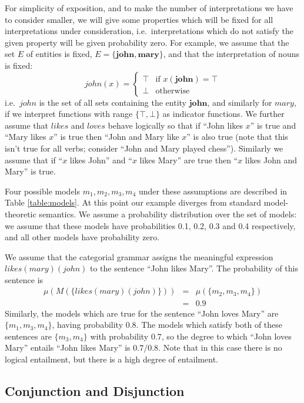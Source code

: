 \documentclass[letterpaper]{article}
\begin{document}
For simplicity of exposition, and to make the number of
interpretations we have to consider smaller, we will give some
properties which will be fixed for all interpretations under
consideration, i.e.~interpretations which do not satisfy the given
property will be given probability zero. For example, we assume that
the set $E$ of entities is fixed, $E = \{\mathbf{john},
\mathbf{mary}\}$, and that the interpretation of nouns is fixed:
$$\mathit{john}(x) = \begin{cases}
\top & \text{if } x(\mathbf{john}) = \top\\
\bot & \text{otherwise}
\end{cases}$$ i.e.~$\mathit{john}$ is the set of all sets containing
the entity $\mathbf{john}$, and similarly for $\mathit{mary}$, if we
interpret functions with range $\{\top,\bot\}$ as indicator
functions. We further assume that $\mathit{likes}$ and
$\mathit{loves}$ behave logically so that if ``John likes $x$'' is
true and ``Mary likes $x$'' is true then ``John and Mary like $x$'' is
also true (note that this isn't true for all verbs; consider ``John
and Mary played chess''). Similarly we assume that if ``$x$ likes
John'' and ``$x$ likes Mary'' are true then ``$x$ likes John and
Mary'' is true.

Four possible models $m_1, m_2, m_3, m_4$ under these assumptions are
described in Table \ref{table:models}. At this point our example
diverges from standard model-theoretic semantics. We assume a
probability distribution over the set of models: we assume that these
models have probabilities 0.1, 0.2, 0.3 and 0.4 respectively, and all
other models have probability zero.

We assume that the categorial grammar assigns the meaningful
expression $\mathit{likes}(\mathit{mary})(\mathit{john})$ to the
sentence ``John likes Mary''. The probability of this sentence is
\begin{eqnarray*}
\mu(M(\{\mathit{likes}(\mathit{mary})(\mathit{john})\})) &=&
\mu(\{m_2, m_3, m_4\})\\
&=&0.9
\end{eqnarray*}
Similarly, the models which are true for the sentence ``John loves
Mary'' are $\{m_1, m_3, m_4\}$, having probability 0.8. The models
which satisfy both of these sentences are $\{m_3, m_4\}$ with
probability 0.7, so the
degree to which ``John loves Mary'' entails ``John likes Mary'' is
$0.7/0.8$. Note that in this case there is no logical entailment, but
there is a high degree of entailment.

\subsection{Conjunction and Disjunction}
\end{document}
